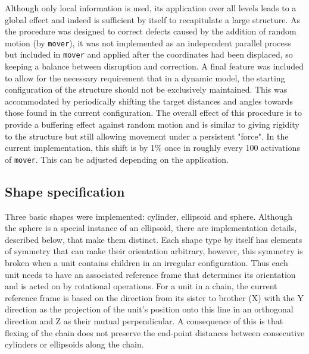 Although only local information is used, its application over all levels leads to a
global effect and indeed is sufficient by itself to recapitulate a large structure.
As the procedure was designed to correct defects caused by the addition of random
motion (by {\tt mover}), it was not implemented as an independent
parallel process but included in {\tt mover} and applied after the coordinates had been 
displaced, so keeping a balance between disruption and correction.  A final feature
was included to allow for the necessary requirement that in a dynamic model, the
starting configuration of the structure should not be exclusively maintained.  This
was accommodated by periodically shifting the target distances and angles towards
those found in the current configuration.   The overall effect of this procedure is
to provide a buffering effect against random motion and is similar to giving
rigidity to the structure but still allowing movement under a persistent "force".
In the current implementation, this shift is by 1\% once in roughly every 100
activations of {\tt mover}.  This can be adjusted depending on the application.

\subsection{Shape specification}

Three basic shapes were implemented: cylinder, ellipsoid and sphere.  Although the 
sphere is a special instance of an ellipsoid, there are implementation details,
described below, that make them distinct.   Each shape type by itself has elements
of symmetry that can make their orientation arbitrary, however, this symmetry is
broken when a unit contains children in an irregular configuration.  Thus each unit
needs to have an associated reference frame that determines its orientation and is
acted on by rotational operations.   For a unit in a chain, the current reference 
frame is based on the direction from its sister to brother (X) with the Y direction 
as the projection of the unit's position onto this line in an orthogonal direction
and Z as their mutual perpendicular.   A consequence of this is that flexing of the
chain does not preserve the end-point distances between consecutive cylinders or
ellipsoids along the chain.


